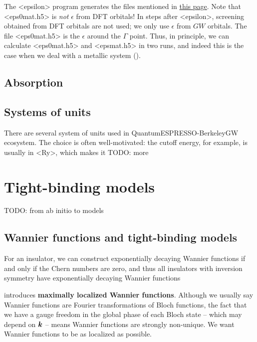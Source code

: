\documentclass[hyperref, a4paper, 12pt]{report}
\newcommand*{\concept}[1]{{\textbf{#1}}}
\def\ce#1{<#1>}%
\def\texttt#1{<#1>}%
\newcommand{\shortcode}[1]{\texttt{#1}}
\begin{document}
The \shortcode{epsilon} program generates the files mentioned in 
\href{http://manual.berkeleygw.org/2.0/epsilon-overview/}{this page}.
Note that \shortcode{eps0mat.h5} is \emph{not} $\epsilon$ from DFT orbitals!
In steps after \shortcode{epsilon},
screening obtained from DFT orbitals are not used;
we only use $\epsilon$ from $GW$ orbitals.
The file \shortcode{eps0mat.h5} is the $\epsilon$ around the $\Gamma$ point.
Thus, in principle,
we can calculate \shortcode{eps0mat.h5} and \shortcode{epsmat.h5}
in two runs,
and indeed this is the case when we deal with a metallic system
().

\section{Absorption}

\subsection{}

\section{Systems of units}

There are several system of units used in QuantumESPRESSO-BerkeleyGW ecosystem.
The choice is often well-motivated: 
the cutoff energy, for example, 
is usually in \ce{Ry},
which makes it TODO: more

\chapter{Tight-binding models}

TODO: from ab initio to models

\section{Wannier functions and tight-binding models}

For an insulator,
we can construct exponentially decaying Wannier functions 
if and only if the Chern numbers are zero, 
and thus all insulators with inversion symmetry 
have exponentially decaying Wannier functions \cite{brouder2007exponential}

\cite{marzari2012maximally} introduces \concept{maximally localized Wannier functions}.
Although we usually say Wannier functions are Fourier transformations of Bloch functions,
the fact that we have a gauge freedom in the global phase of each Bloch state
-- which may depend on $\vb*{k}$ --  
means Wannier functions are strongly non-unique.
We want Wannier functions to be as localized as possible. 
\end{document}
